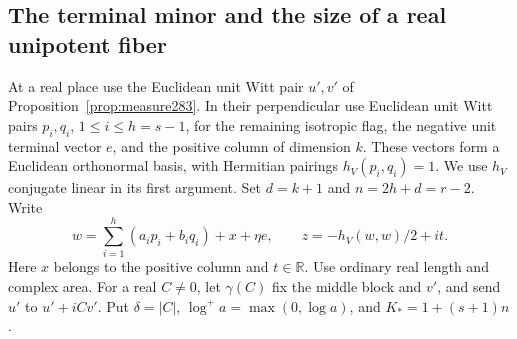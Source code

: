 \documentclass[a4paper,11pt]{article}
\theoremstyle{definition}
\theoremstyle{remark}
\newcommand{\RR}{\mathbb R}\newcommand{\CC}{\mathbb C}\newcommand{\QQ}{\mathbb Q}
\numberwithin{equation}{section}
\begin{document}
\subsection{The terminal minor and the size of a real unipotent fiber}\label{nav:VIII-50}
At a real place use the Euclidean unit Witt pair \(u',v'\) of
Proposition~\ref{prop:measure283}. In their perpendicular use
Euclidean unit Witt pairs \(p_i,q_i\), \(1\le i\le h=s-1\),
for the remaining isotropic flag, the negative unit terminal
vector \(e\), and the positive column of dimension \(k\).
These vectors form a Euclidean orthonormal basis, with
Hermitian pairings \(h_V(p_i,q_i)=1\). We use \(h_V\)
conjugate linear in its first argument. Set \(d=k+1\) and
\(n=2h+d=r-2\). Write
\[
 w=\sum_{i=1}^h(a_i p_i+b_i q_i)+x+\eta e,\qquad
 z=-h_V(w,w)/2+it .
\]
Here \(x\) belongs to the positive column and \(t\in\RR\).
Use ordinary real length and complex area. For a real
\(C\ne0\), let \(\gamma(C)\) fix the middle block and \(v'\),
and send \(u'\) to \(u'+iC v'\). Put \(\delta=|C|\),
\(\log^+ a=\max(0,\log a)\), and \(K_*=1+(s+1)n\).
\end{document}
